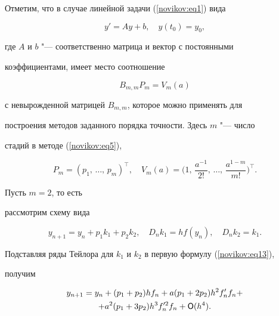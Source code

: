 Отметим, что в случае линейной задачи (\ref{novikov:eq1}) вида

\begin{equation*}

y'=Ay+b,\quad y(t_0)=y_0,

\end{equation*}

где $A$ и $b$ "--- соответственно матрица и вектор с постоянными

коэффициентами, имеет место соотношение

\begin{equation*}

B_{m,m}P_m=V_m(a)

\end{equation*}

с невырожденной матрицей $B_{m,m}$, которое можно применять для

построения методов заданного порядка точности. Здесь   $m$ "--- число

стадий в методе (\ref{novikov:eq5}),

\begin{equation*}

P_m=(p_1,\,\ldots,\,p_m)^\top,\quad V_m(a)=\biggl(1,\,\frac{a^{-1}}{2!},\,\ldots,\,\frac{a^{1-m}}{m!} \biggr)^\top.

\end{equation*}



\smallskip



 Пусть $m=2$, то есть

рассмотрим схему вида

\begin{equation}

\label{novikov:eq13}

y_{n+1}=y_n+p_1k_1+p_2k_2,\quad D_nk_1=hf(y_n),\quad D_nk_2=k_1.

\end{equation}

Подставляя ряды Тейлора для $k_1$ и $k_2$ в первую формулу (\ref{novikov:eq13}),

получим

\begin{multline*}

y_{n+1}=y_n+(p_1+p_2)hf_n +a(p_1+2p_2)h^2f'_nf_n+\\

+a^2(p_1+3p_2)h^3f'^2_nf_n+{\sf O}(h^4).

\end{multline*}

